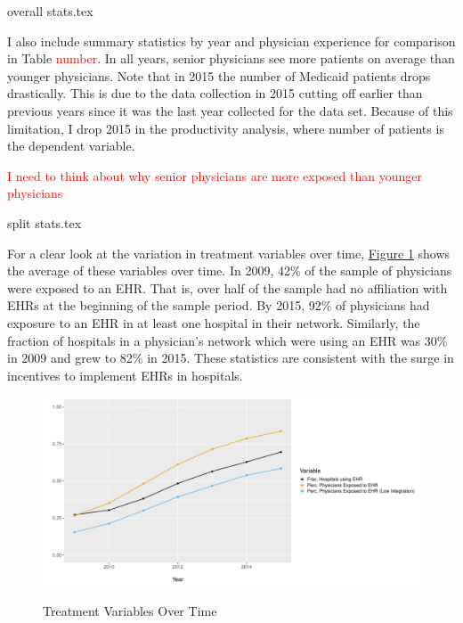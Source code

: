 \documentclass[11pt]{article}
\begin{document}
\vspace{5mm}
{overall stats.tex}
\vspace{5mm}

I also include summary statistics by year and physician experience for comparison in Table \textcolor{red}{number}. In all years, senior physicians see more patients on average than younger physicians. Note that in 2015 the number of Medicaid patients drops drastically. This is due to the data collection in 2015 cutting off earlier than previous years since it was the last year collected for the data set. Because of this limitation, I drop 2015 in the productivity analysis, where number of patients is the dependent variable. 

\textcolor{red}{I need to think about why senior physicians are more exposed than younger physicians}



\vspace{5mm}
{split stats.tex}
\vspace{5mm}




For a clear look at the variation in treatment variables over time, \hyperref[fig:figure1]{Figure 1} shows the average of these variables over time. In 2009, 42\% of the sample of physicians were exposed to an EHR. That is, over half of the sample had no affiliation with EHRs at the beginning of the sample period. By 2015, 92\% of physicians had exposure to an EHR in at least one hospital in their network. Similarly, the fraction of hospitals in a physician's network which were using an EHR was 30\% in 2009 and grew to 82\% in 2015. These statistics are consistent with the surge in incentives to implement EHRs in hospitals. 

\vspace{5mm}
\begin{figure}[ht]
    \caption{Treatment Variables Over Time}
    \vspace{-2mm}
    \includegraphics[scale=.5]{Objects/sum_stats_year.pdf}
    \label{fig:figure1}
\end{figure}
\vspace{5mm}
\end{document}
